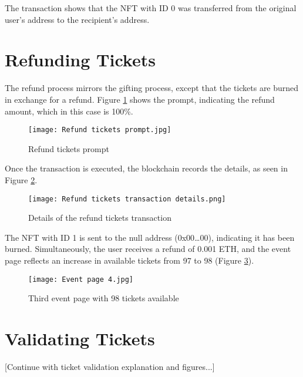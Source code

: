 The transaction shows that the NFT with ID 0 was transferred from the original
user's address to the recipient's address.

\section{Refunding Tickets}
\label{sec:refund_tickets}

The refund process mirrors the gifting process, except that the tickets are
burned in exchange for a refund. Figure \ref{fig:refund_tickets_prompt} shows
the prompt, indicating the refund amount, which in this case is 100\%.

\begin{figure}[H]
    \texttt{[image: Refund tickets prompt.jpg]}
    \centering
    \caption{Refund tickets prompt}
    \label{fig:refund_tickets_prompt}
\end{figure}

Once the transaction is executed, the blockchain records the details, as seen
in Figure \ref{fig:refund_tickets_transaction_details}.

\begin{figure}[H]
    \texttt{[image: Refund tickets transaction details.png]}
    \centering
    \caption{Details of the refund tickets transaction}
    \label{fig:refund_tickets_transaction_details}
\end{figure}

The NFT with ID 1 is sent to the null address (0x00\dots00), indicating it has
been burned. Simultaneously, the user receives a refund of 0.001 ETH, and the
event page reflects an increase in available tickets from 97 to 98 (Figure
\ref{fig:refund_tickets_event}).

\begin{figure}[H]
    \texttt{[image: Event page 4.jpg]}
    \centering
    \caption{Third event page with 98 tickets available}
    \label{fig:refund_tickets_event}
\end{figure}

\section{Validating Tickets}
\label{sec:validate_tickets}

[Continue with ticket validation explanation and figures...]

